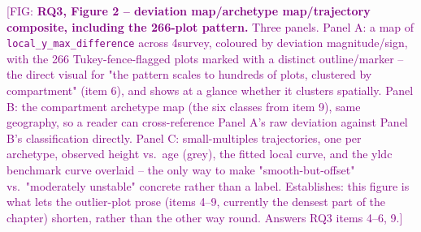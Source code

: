 \documentclass[11pt,a4paper]{report}
\newcommand{\fig}[1]{\textcolor{purple}{[FIG: #1]}}
\begin{document}
\fig{\textbf{RQ3, Figure 2 -- deviation map/archetype map/trajectory composite,
including the 266-plot pattern.} Three panels. Panel A: a map of
\texttt{local\_y\_max\_difference} across 4survey, coloured by deviation
magnitude/sign, with the 266 Tukey-fence-flagged plots marked with a distinct
outline/marker -- the direct visual for "the pattern scales to hundreds of plots,
clustered by compartment" (item 6), and shows at a glance whether it clusters
spatially. Panel B: the compartment archetype map (the six classes from item 9), same
geography, so a reader can cross-reference Panel A's raw deviation against Panel B's
classification directly. Panel C: small-multiples trajectories, one per archetype,
observed height vs.\ age (grey), the fitted local curve, and the yldc benchmark curve
overlaid -- the only way to make "smooth-but-offset" vs.\ "moderately unstable"
concrete rather than a label. Establishes: this figure is what lets the outlier-plot
prose (items 4--9, currently the densest part of the chapter) shorten, rather than the
other way round. Answers RQ3 items 4--6, 9.}
\end{document}
